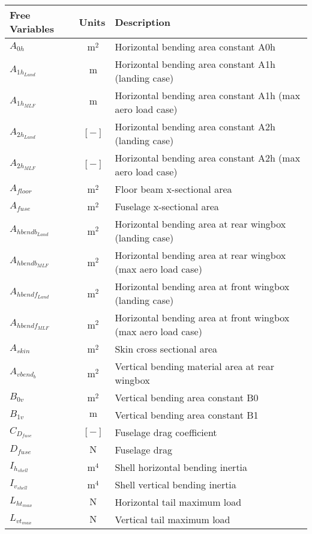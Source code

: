 \documentclass[12pt]{article}
\begin{document}
{\footnotesize
\begin{supertabular}{lcl}
\toprule
Free Variables & Units & Description \\ \midrule
$A_{0h}$ & $~\mathrm{m^{2}}$ & Horizontal bending area constant A0h \\
$A_{1h_{Land}}$ & $~\mathrm{m}$ & Horizontal bending area constant A1h (landing case) \\
$A_{1h_{MLF}}$ & $~\mathrm{m}$ & Horizontal bending area constant A1h (max aero load case) \\
$A_{2h_{Land}}$ & $~[-]$ & Horizontal bending area constant A2h (landing case) \\
$A_{2h_{MLF}}$ & $~[-]$ & Horizontal bending area constant A2h (max aero load case) \\
$A_{floor}$ & $~\mathrm{m^{2}}$ & Floor beam x-sectional area \\
$A_{fuse}$ & $~\mathrm{m^{2}}$ & Fuselage x-sectional area \\
$A_{hbendb_{Land}}$ & $~\mathrm{m^{2}}$ & Horizontal bending area at rear wingbox (landing case) \\
$A_{hbendb_{MLF}}$ & $~\mathrm{m^{2}}$ & Horizontal bending area at rear wingbox (max aero load case) \\
$A_{hbendf_{Land}}$ & $~\mathrm{m^{2}}$ & Horizontal bending area at front wingbox (landing case) \\
$A_{hbendf_{MLF}}$ & $~\mathrm{m^{2}}$ & Horizontal bending area at front wingbox (max aero load case) \\
$A_{skin}$ & $~\mathrm{m^{2}}$ & Skin cross sectional area \\
$A_{vbend_{b}}$ & $~\mathrm{m^{2}}$ & Vertical bending material area at rear wingbox \\
$B_{0v}$ & $~\mathrm{m^{2}}$ & Vertical bending area constant B0 \\
$B_{1v}$ & $~\mathrm{m}$ & Vertical bending area constant B1 \\
$C_{D_{fuse}}$ & $~[-]$ & Fuselage drag coefficient \\ 
$D_{fuse}$ & $~\mathrm{N}$ & Fuselage drag \\ 
$I_{h_{shell}}$ & $~\mathrm{m^{4}}$ & Shell horizontal bending inertia \\
$I_{v_{shell}}$ & $~\mathrm{m^{4}}$ & Shell vertical bending inertia \\
$L_{ht_{max}}$ & $~\mathrm{N}$ & Horizontal tail maximum load \\
$L_{vt_{max}}$ & $~\mathrm{N}$ & Vertical tail maximum load \\

\end{supertabular}}
\end{document}
